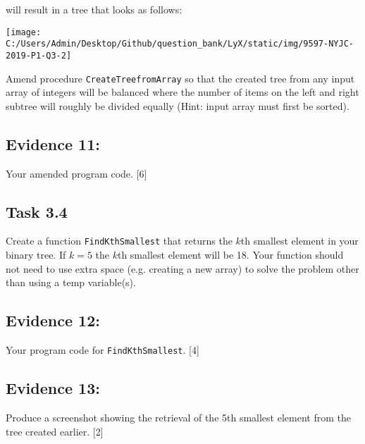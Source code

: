 will result in a tree that looks as follows: 
\begin{center}
\texttt{[image: C:/Users/Admin/Desktop/Github/question\_bank/LyX/static/img/9597-NYJC-2019-P1-Q3-2]}
\par\end{center}

Amend procedure \texttt{CreateTreefromArray} so that the created tree
from any input array of integers will be balanced where the number
of items on the left and right subtree will roughly be divided equally
(Hint: input array must first be sorted).

\subsection*{Evidence 11: }

Your amended program code. \hfill{}{[}6{]}

\subsection*{Task 3.4 }

Create a function \texttt{FindKthSmallest} that returns the $k$th
smallest element in your binary tree. If $k=5$ the $k$th smallest
element will be 18. Your function should not need to use extra space
(e.g. creating a new array) to solve the problem other than using
a temp variable(s). 

\subsection*{Evidence 12: }

Your program code for \texttt{FindKthSmallest}. \hfill{}{[}4{]}

\subsection*{Evidence 13:}

Produce a screenshot showing the retrieval of the 5th smallest element
from the tree created earlier. \hfill{}{[}2{]}
